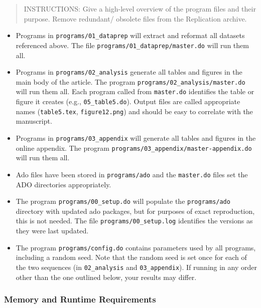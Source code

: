 \documentclass[
]{article}
\providecommand{\tightlist}{%
  \setlength{\itemsep}{0pt}\setlength{\parskip}{0pt}}
\begin{document}
\begin{quote}
INSTRUCTIONS: Give a high-level overview of the program files and their
purpose. Remove redundant/ obsolete files from the Replication archive.
\end{quote}

\begin{itemize}
\tightlist
\item
  Programs in \texttt{programs/01\_dataprep} will extract and reformat
  all datasets referenced above. The file
  \texttt{programs/01\_dataprep/master.do} will run them all.
\item
  Programs in \texttt{programs/02\_analysis} generate all tables and
  figures in the main body of the article. The program
  \texttt{programs/02\_analysis/master.do} will run them all. Each
  program called from \texttt{master.do} identifies the table or figure
  it creates (e.g., \texttt{05\_table5.do}). Output files are called
  appropriate names (\texttt{table5.tex}, \texttt{figure12.png}) and
  should be easy to correlate with the manuscript.
\item
  Programs in \texttt{programs/03\_appendix} will generate all tables
  and figures in the online appendix. The program
  \texttt{programs/03\_appendix/master-appendix.do} will run them all.
\item
  Ado files have been stored in \texttt{programs/ado} and the
  \texttt{master.do} files set the ADO directories appropriately.
\item
  The program \texttt{programs/00\_setup.do} will populate the
  \texttt{programs/ado} directory with updated ado packages, but for
  purposes of exact reproduction, this is not needed. The file
  \texttt{programs/00\_setup.log} identifies the versions as they were
  last updated.
\item
  The program \texttt{programs/config.do} contains parameters used by
  all programs, including a random seed. Note that the random seed is
  set once for each of the two sequences (in \texttt{02\_analysis} and
  \texttt{03\_appendix}). If running in any order other than the one
  outlined below, your results may differ.
\end{itemize}

\hypertarget{memory-and-runtime-requirements}{%
\subsubsection{Memory and Runtime
Requirements}\label{memory-and-runtime-requirements}}
\end{document}
